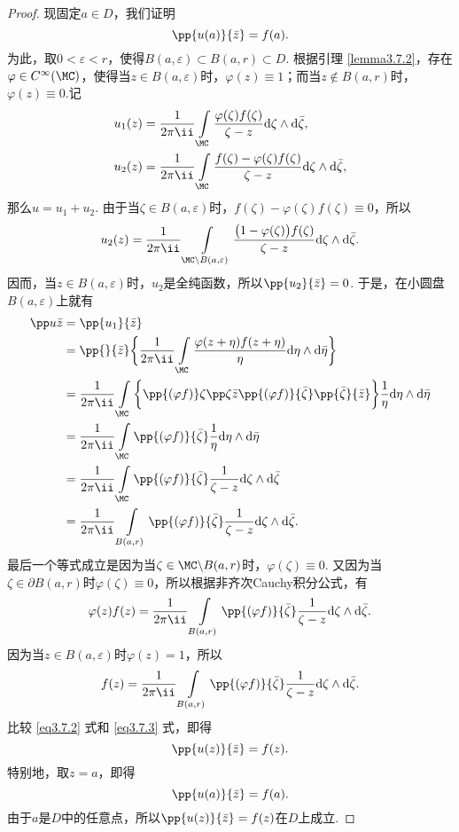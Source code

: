 \begin{proof}
现固定$a\in D$，我们证明
\[\pp{u(a)}{\bar z}=f(a).\]
为此，取$0<\varepsilon<r$，使得$B(a,\varepsilon)\subset B(a,r)\subset D$. 根据引理 \ref{lemma3.7.2}，存在$\varphi\in C^\infty(\MC)$，使得当$z\in B(a,\varepsilon)$时，$\varphi(z)\equiv1$；而当$z\notin B(a,r)$时，$\varphi(z)\equiv0$.记
\begin{align*}
&u_1(z)=\frac1{2\pi\ii}\int\limits_\MC\frac{\varphi(\zeta)f(\zeta)}{\zeta-z}\textrm d\zeta\wedge\textrm d\bar \zeta,\\
&u_2(z)=\frac1{2\pi\ii}\int\limits_\MC\frac{f(\zeta)-\varphi(\zeta)f(\zeta)}{\zeta-z}\textrm d\zeta\wedge\textrm d\bar \zeta,
\end{align*}
那么$u=u_1+u_2$. 由于当$\zeta\in B(a,\varepsilon)$时，$f(\zeta)-\varphi(\zeta)f(\zeta)\equiv0$，所以
\[u_2(z)=\frac1{2\pi\ii}\int\limits_{\MC\backslash B(a,\varepsilon)}\frac{\big(1-\varphi(\zeta)\big)f(\zeta)}{\zeta-z}\textrm d\zeta\wedge\textrm d\bar \zeta.\]
因而，当$z\in B(a,\varepsilon)$时，$u_2$是全纯函数，所以$\pp{u_2}{\bar z}=0$. 于是，在小圆盘$B(a,\varepsilon)$上就有
\begin{equation}\label{eq3.7.2}
\begin{aligned}
\pp u{\bar z}&=\pp{u_1}{\bar z}\\
&=\pp{}{\bar z}\bigg\{\frac1{2\pi\ii}\int\limits_\MC\frac{\varphi(z+\eta)f(z+\eta)}\eta\textrm d\eta\wedge\textrm d\bar\eta\bigg\}\\
&=\frac1{2\pi\ii}\int\limits_\MC\bigg\{\pp{(\varphi f)}\zeta\pp\zeta{\bar z}
\pp{(\varphi f)}{\bar \zeta}\pp{\bar \zeta}{\bar z}\bigg\}\frac1\eta\textrm d\eta\wedge\textrm d\bar\eta\\
&=\frac1{2\pi\ii}\int\limits_\MC\pp{(\varphi f)}{\bar\zeta}\frac1\eta\textrm d\eta\wedge\textrm d\bar\eta\\
&=\frac1{2\pi\ii}\int\limits_\MC\pp{(\varphi f)}{\bar\zeta}\frac1{\zeta-z}\textrm d\zeta\wedge\textrm d\bar\zeta\\
&=\frac1{2\pi\ii}\int\limits_{B(a,r)}\pp{(\varphi f)}{\bar\zeta}\frac1{\zeta-z}
\textrm d\zeta\wedge\textrm d\bar\zeta.
\end{aligned}
\end{equation}
最后一个等式成立是因为当$\zeta\in\MC\backslash B(a,r)$时，$\varphi(\zeta)\equiv0$. 又因为当$\zeta\in\partial B(a,r)$时$\varphi(\zeta)\equiv0$，所以根据非齐次Cauchy积分公式，有
\[\varphi(z)f(z)=\frac1{2\pi\ii}\int\limits_{B(a,r)}\pp{(\varphi f)}{\bar\zeta}
\frac1{\zeta-z}\textrm d\zeta\wedge\textrm d\bar\zeta.\]
因为当$z\in B(a,\varepsilon)$时$\varphi(z)=1$，所以
\begin{equation}\label{eq3.7.3}
f(z)=\frac1{2\pi\ii}\int\limits_{B(a,r)}\pp{(\varphi f)}{\bar\zeta}
\frac1{\zeta-z}\textrm d\zeta\wedge\textrm d\bar\zeta.
\end{equation}
比较 \eqref{eq3.7.2} 式和 \eqref{eq3.7.3} 式，即得
\[\pp{u(z)}{\bar z}=f(z).\]
特别地，取$z=a$，即得
\[\pp{u(a)}{\bar z}=f(a).\]
由于$a$是$D$中的任意点，所以$\pp{u(z)}{\bar z}=f(z)$在$D$上成立.
\end{proof}

